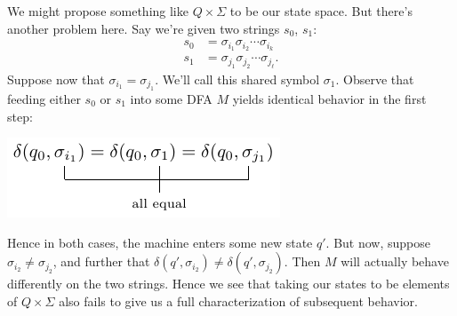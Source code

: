 \documentclass{fkpaper}
\begin{document}
\begin{multicols}{2}
  We might propose something like $Q \times \Sigma$ to be our state
  space. But there's another problem here. Say we're given two strings
  $s_0$, $s_1$:
  \begin{align*}
    s_0
    &= \sigma_{i_1} \sigma_{i_2} \cdots \sigma_{i_k} \\
    s_1
    &= \sigma_{j_1} \sigma_{j_2} \cdots \sigma_{j_\ell}.
  \end{align*}
  Suppose now that $\sigma_{i_1} = \sigma_{j_1}$. We'll call this shared
  symbol $\sigma_1$. Observe that feeding either $s_0$ or $s_1$ into
  some DFA $M$ yields identical behavior in the first step:
  \begin{center}
    \includegraphics{figures/labeled-equation.pdf}
  \end{center}
  Hence in both cases, the machine enters some new state $q'$. But now,
  suppose $\sigma_{i_2} \neq \sigma_{j_2}$, and further that $\delta(q',
  \sigma_{i_2}) \neq \delta(q', \sigma_{j_2})$. Then $M$ will actually
  behave differently on the two strings. Hence we see that taking our
  states to be elements of $Q \times \Sigma$ also fails to give us a
  full characterization of subsequent behavior.


\end{multicols}
\end{document}
